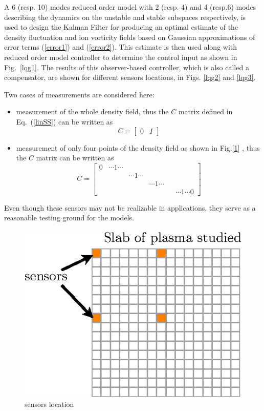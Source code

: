 \documentclass[12pt,lot, lof]{puthesis}
\begin{document}
 A 6 (resp. 10) modes reduced order model with 2 (resp. 4) and 4 (resp.6) modes describing the dynamics on the unstable and stable subspaces respectively, is used to design the Kalman Filter for producing an optimal estimate of the density fluctuation and ion vorticity fields based on Gaussian approximations of error terms (\ref{error1}) and (\ref{error2}). This estimate is then used along with reduced order model controller to determine the control input as shown in Fig.~\ref{lqg1}. The results of this observer-based controller, which is also called a compensator, are shown for different sensors locations, in Figs. \ref{lqg2} and \ref{lqg3}.
 
Two cases of measurements are considered here:
\begin{itemize}
\item measurement of the whole density field, thus the $C$ matrix defined in Eq.~(\ref{linSS}) can be written as
\begin{equation}
C = [\begin{matrix}  0 & I \end{matrix}]
\end{equation}
\item measurement of only four points of the density field  as shown in Fig.[\ref{lqg4}] , thus the $C$ matrix can be written as
\begin{equation}
C = \left[ \begin{matrix}  0&  \dotsb 1 \dotsb &  & & & \\   & & \dotsb 1 \dotsb& &  \\  & & &  \dotsb 1 \dotsb& & \\ & & & & & \dotsb 1 \dotsb 0 \end{matrix} \right]
\end{equation}
\end{itemize}
Even though these sensors may not be realizable in applications, they serve as a reasonable testing ground for the models.
\begin{figure}[htb]
\centering
\includegraphics[width=0.65 \linewidth]{observer4}
\caption{sensors location}
\label{lqg4}
\end{figure}
\end{document}
